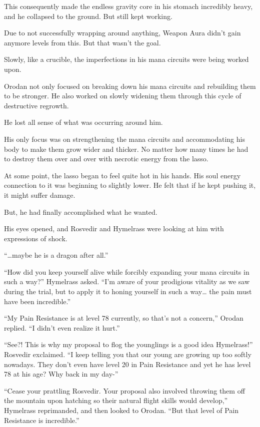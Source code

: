 \documentclass[a4paper,10pt]{book}
\begin{document}
This consequently made the endless gravity core in his stomach incredibly heavy, and he collapsed to the ground. But still kept working.\par
Due to not successfully wrapping around anything, Weapon Aura didn’t gain anymore levels from this. But that wasn’t the goal.\par
Slowly, like a crucible, the imperfections in his mana circuits were being worked upon.\par
Orodan not only focused on breaking down his mana circuits and rebuilding them to be stronger. He also worked on slowly widening them through this cycle of destructive regrowth.\par
He lost all sense of what was occurring around him.\par
His only focus was on strengthening the mana circuits and accommodating his body to make them grow wider and thicker. No matter how many times he had to destroy them over and over with necrotic energy from the lasso.\par
At some point, the lasso began to feel quite hot in his hands. His soul energy connection to it was beginning to slightly lower. He felt that if he kept pushing it, it might suffer damage.\par
But, he had finally accomplished what he wanted.\par
His eyes opened, and Rosvedir and Hymelrass were looking at him with expressions of shock.\par
“…maybe he is a dragon after all.”\par
“How did you keep yourself alive while forcibly expanding your mana circuits in such a way?” Hymelrass asked. “I’m aware of your prodigious vitality as we saw during the trial, but to apply it to honing yourself in such a way… the pain must have been incredible.”\par
“My Pain Resistance is at level 78 currently, so that’s not a concern,” Orodan replied. “I didn’t even realize it hurt.”\par
“See?! This is why my proposal to flog the younglings is a good idea Hymelrass!” Rosvedir exclaimed. “I keep telling you that our young are growing up too softly nowadays. They don’t even have level 20 in Pain Resistance and yet he has level 78 at his age? Why back in my day-”\par
“Cease your prattling Rosvedir. Your proposal also involved throwing them off the mountain upon hatching so their natural flight skills would develop,” Hymelrass reprimanded, and then looked to Orodan. “But that level of Pain Resistance is incredible.”\par
\end{document}

